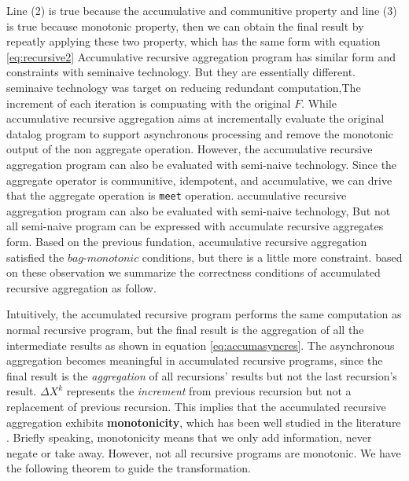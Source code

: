 {{		\normalsize
		Line (2) is true because the accumulative and communitive property and line (3) is true because monotonic property, then we can obtain the final result by repeatly applying these two property, which has the same form with equation \ref{eq:recursive2}
	}
	{\color{red}
		Accumulative recursive aggregation program has similar form and constraints with seminaive technology. But they are essentially different.
		seminaive technology was target on reducing redundant computation,The increment of each iteration is compuating with the original $F$. While accumulative recursive aggregation aims at incrementally evaluate the original datalog program to support asynchronous processing and remove the monotonic output of the non aggregate operation. However, the accumulative recursive aggregation program can also be evaluated with semi-naive technology. Since the aggregate operator is communitive, idempotent, and accumulative, we can drive that the aggregate operation is \texttt{meet} operation.
	}
	{\color{green}	
		accumulative recursive aggregation program can also be evaluated with semi-naive technology, 
		But not all semi-naive program can be expressed with accumulate recursive aggregates form.  %
		Based on the previous fundation, accumulative recursive aggregation  satisfied the $bag$-$monotonic$ conditions, but there is a little more constraint.
		based on these observation we summarize the correctness conditions of accumulated recursive aggregation as follow.
	}
	
	
	{\color{green}
		Intuitively, the accumulated recursive program performs the same computation as normal recursive program, but the final result is the aggregation of all the intermediate results as shown in equation \ref{eq:accumasyncres}. The asynchronous aggregation becomes meaningful in accumulated recursive programs, since the final result is the \emph{aggregation} of all recursions' results but not the last recursion's result. $\Delta X^{k}$ represents the \emph{increment} from previous recursion but not a replacement of previous recursion. This implies that the accumulated recursive aggregation exhibits \textbf{monotonicity}, which has been well studied in the literature \cite{Hellerstein:2010:DIE:1860702.1860704,calm,Lam:2013:SDE:2510649.2511289,Wang:2015:AFR:2824032.2824052}. Briefly speaking, monotonicity means that we only add information, never negate or take away. However, not all recursive programs are monotonic. We have the following theorem to guide the transformation.
	}
	
}
